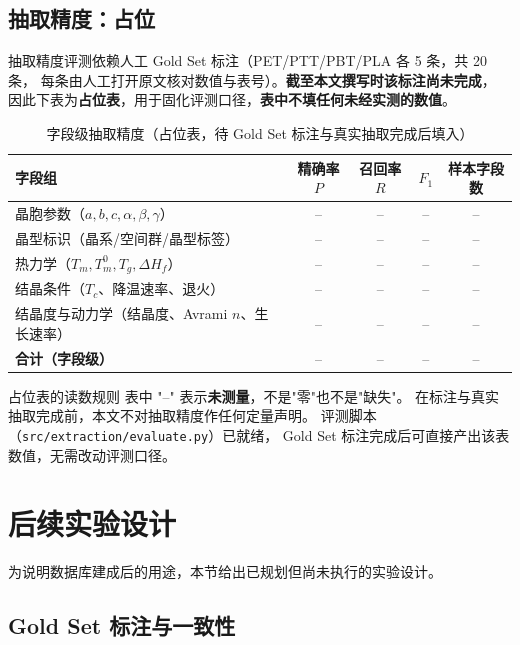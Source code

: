 \documentclass[11pt,a4paper]{ctexart}
\begin{document}
\subsection{抽取精度：占位}\label{sec:placeholder}

抽取精度评测依赖人工 Gold Set 标注（PET/PTT/PBT/PLA 各 5 条，共 20 条，
每条由人工打开原文核对数值与表号）。\textbf{截至本文撰写时该标注尚未完成}，
因此下表为\textbf{占位表}，用于固化评测口径，\textbf{表中不填任何未经实测的数值}。

\begin{table}[htbp]
\centering
\caption{字段级抽取精度（占位表，待 Gold Set 标注与真实抽取完成后填入）}
\label{tab:placeholder}
\begin{tabular}{l c c c c}
\toprule
字段组 & 精确率 $P$ & 召回率 $R$ & $F_1$ & 样本字段数\\
\midrule
晶胞参数（$a,b,c,\alpha,\beta,\gamma$） & -- & -- & -- & --\\
晶型标识（晶系/空间群/晶型标签） & -- & -- & -- & --\\
热力学（$T_m, T_m^0, T_g, \Delta H_f$） & -- & -- & -- & --\\
结晶条件（$T_c$、降温速率、退火） & -- & -- & -- & --\\
结晶度与动力学（结晶度、Avrami $n$、生长速率） & -- & -- & -- & --\\
\midrule
\textbf{合计（字段级）} & -- & -- & -- & --\\
\bottomrule
\end{tabular}
\end{table}

\begin{warnbox}{占位表的读数规则}
表中 "--" 表示\textbf{未测量}，不是"零"也不是"缺失"。
在标注与真实抽取完成前，本文不对抽取精度作任何定量声明。
评测脚本（\texttt{src/extraction/evaluate.py}）已就绪，
Gold Set 标注完成后可直接产出该表数值，无需改动评测口径。
\end{warnbox}

\section{后续实验设计}\label{sec:design}

为说明数据库建成后的用途，本节给出已规划但尚未执行的实验设计。

\subsection{Gold Set 标注与一致性}
\end{document}
